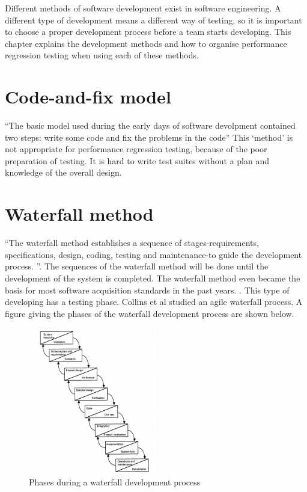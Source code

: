 Different methods of software development exist in software engineering. A different type of development means a different way of testing, so it is important to choose a proper development process before a team starts developing. This chapter explains the development methods and how to organise performance regression testing when using each of these methods.

\section{Code-and-fix model}
``The basic model used during the early days of software devolpment contained two steps: write some code and fix the problems in the code'' \cite{boehm1988spiral} This `method' is not appropriate for performance regression testing, because of the poor preparation of testing. It is hard to write test suites without a plan and knowledge of the overall design.

\section{Waterfall method}
``The waterfall method establishes a sequence of stages-requirements, specifications, design, coding, testing and maintenance-to guide the development process. ''\cite{kang1989software}. The sequences of the waterfall method will be done until the development of the system is completed. The waterfall method even became the basis for most software acquisition standards in the past years. \cite{boehm1988spiral}. This type of developing has a testing phase. Collins et al studied an agile waterfall process. \cite{collins2010iterative} A figure giving the phases of the waterfall development process are shown below.

\begin{figure}[H]
\begin{center}
  \includegraphics[width=0.5\textwidth]{Figures/waterfall.jpg}
\end{center}
  \caption{Phases during a waterfall development process\cite{boehm1988spiral}} 
\end{figure}

